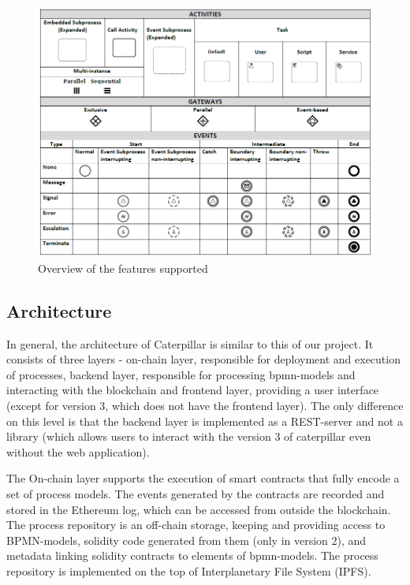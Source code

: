 \begin{figure}[hbt]
	\includegraphics[width=\textwidth]{gfx/caterpillar-bpmn}
	\caption{Overview of the features supported}
	\label{fig:caterpillar:overview:bpmn}
\end{figure}

\subsection{Architecture}
\label{sec:caterpillar:overview:architecture}

In general, the architecture of Caterpillar is similar to this of our project. It consists of three layers - on-chain layer, responsible for deployment and execution of processes, backend layer, responsible for processing bpmn-models and interacting with the blockchain and frontend layer, providing a user interface (except for version 3, which does not have the frontend layer). The only difference on this level is that the backend layer is implemented as a REST-server and not a library (which allows users to interact with the version 3 of caterpillar even without the web application).

The On-chain layer supports the execution of smart contracts that fully encode a set of process models. The events generated by the contracts are recorded and stored in the Ethereum log, which can be accessed from outside the blockchain. The process repository is an off-chain storage, keeping and providing access to BPMN-models, solidity code generated from them (only in version 2), and metadata linking solidity contracts to elements of bpmn-models. The process repository is implemented on the top of Interplanetary File System (IPFS).

